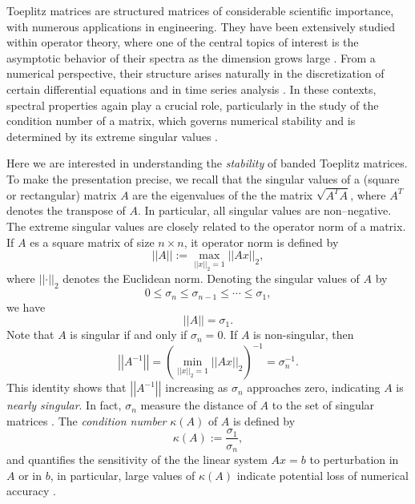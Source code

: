 \documentclass[12pt]{amsart}
\theoremstyle{plain}
\numberwithin{equation}{section}
\newcommand{\<}{\langle}
\renewcommand{\>}{\rangle}
\newcommand{\PP}[1]{\left(#1\right)}
\newcommand{\norm}[1]{\left|\left|#1\right|\right|}
\begin{document}
Toeplitz matrices are structured matrices of considerable scientific importance, with numerous applications in engineering. They have been extensively studied within operator theory, where one of the central topics of interest is the asymptotic behavior of their spectra as the dimension grows large \cite{bottcher2005spectral, bottcher2006analysis}. From a numerical perspective, their structure arises naturally in the discretization of certain differential equations and in time series analysis \cite{chan2007introduction}. In these contexts, spectral properties again play a crucial role, particularly in the study of the condition number of a matrix, which governs numerical stability and is determined by its extreme singular values \cite{ng2004iterative, chan2007introduction}.

Here we are interested in understanding the {\it stability} of banded Toeplitz matrices. To make the presentation precise, we recall that the singular values of a (square or rectangular) matrix $A$ are the eigenvalues of the the matrix $\sqrt{A^T A}$, where $A^T$ denotes the transpose of $A$. In particular, all singular values are non--negative. The extreme singular values are closely related to the operator norm of a matrix. If $A$ es a square matrix of size $n\times n$, it operator norm is defined by 
\[
\norm{A} := \max_{\norm{x}_2=1} \norm{Ax}_2,
\]
where $\norm{\cdot}_2$ denotes the Euclidean norm. Denoting the singular values of $A$ by
\[
0\leq \sigma_{n} \leq \sigma_{n-1}\leq \cdots \leq \sigma_{1},
\]
we have
\[
\norm{A} = \sigma_1.
\]
Note that $A$ is singular if and only if $\sigma_{n}=0$. If $A$ is non-singular, then
\[
\norm{A^{-1}} = \PP{\min_{\norm{x}_2=1} \norm{Ax}_2}^{-1} = \sigma_{n}^{-1}.
\]
This identity shows that $\norm{A^{-1}}$ increasing as $\sigma_{n}$ approaches zero, indicating $A$ is {\it nearly singular}. In fact, $\sigma_n$ measure the distance of $A$ to the set of singular matrices \cite{bottcher2005spectral, burgisser2013condition, golub2013matrix}. The {\it condition number} $\kappa(A)$ of $A$ is defined by 
\[
\kappa(A) := \frac{\sigma_1}{\sigma_n},
\]
and quantifies the sensitivity of the the linear system $Ax=b$ to perturbation in $A$ or in $b$, in particular, large values of $\kappa(A)$ indicate potential loss of numerical accuracy \cite{burgisser2013condition, goldstine1951numerical, smale1985efficiency,wozniakowski1976numerical}.
\end{document}
